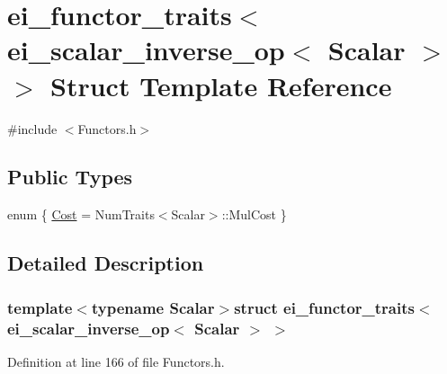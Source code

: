 \hypertarget{structei__functor__traits_3_01ei__scalar__inverse__op_3_01_scalar_01_4_01_4}{\section{ei\-\_\-functor\-\_\-traits$<$ ei\-\_\-scalar\-\_\-inverse\-\_\-op$<$ Scalar $>$ $>$ Struct Template Reference}
\label{structei__functor__traits_3_01ei__scalar__inverse__op_3_01_scalar_01_4_01_4}
}


{\ttfamily \#include $<$Functors.\-h$>$}

\subsection*{Public Types}
\begin{DoxyCompactItemize}
\item 
enum \{ \hyperlink{structei__functor__traits_3_01ei__scalar__inverse__op_3_01_scalar_01_4_01_4_a4df02a5e952e281d65999a3da1520ceca8841268f6306fb77aef38cf9049911ed}{Cost} = Num\-Traits$<$Scalar$>$\-:\-:Mul\-Cost
 \}
\end{DoxyCompactItemize}


\subsection{Detailed Description}
\subsubsection*{template$<$typename Scalar$>$struct ei\-\_\-functor\-\_\-traits$<$ ei\-\_\-scalar\-\_\-inverse\-\_\-op$<$ Scalar $>$ $>$}



Definition at line 166 of file Functors.\-h.



